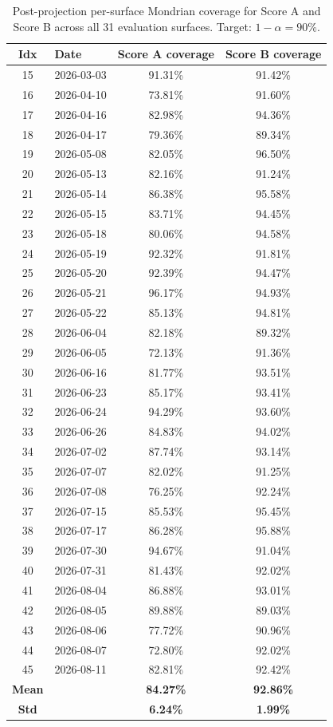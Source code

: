 \begin{table}[H]
\centering
\small
\begin{tabular}{|c|l|c|c|}
\hline
\textbf{Idx} & \textbf{Date} & \textbf{Score A coverage} & \textbf{Score B coverage} \\
\hline
15 & 2026-03-03 & 91.31\% & 91.42\% \\
16 & 2026-04-10 & 73.81\% & 91.60\% \\
17 & 2026-04-16 & 82.98\% & 94.36\% \\
18 & 2026-04-17 & 79.36\% & 89.34\% \\
19 & 2026-05-08 & 82.05\% & 96.50\% \\
20 & 2026-05-13 & 82.16\% & 91.24\% \\
21 & 2026-05-14 & 86.38\% & 95.58\% \\
22 & 2026-05-15 & 83.71\% & 94.45\% \\
23 & 2026-05-18 & 80.06\% & 94.58\% \\
24 & 2026-05-19 & 92.32\% & 91.81\% \\
25 & 2026-05-20 & 92.39\% & 94.47\% \\
26 & 2026-05-21 & 96.17\% & 94.93\% \\
27 & 2026-05-22 & 85.13\% & 94.81\% \\
28 & 2026-06-04 & 82.18\% & 89.32\% \\
29 & 2026-06-05 & 72.13\% & 91.36\% \\
30 & 2026-06-16 & 81.77\% & 93.51\% \\
31 & 2026-06-23 & 85.17\% & 93.41\% \\
32 & 2026-06-24 & 94.29\% & 93.60\% \\
33 & 2026-06-26 & 84.83\% & 94.02\% \\
34 & 2026-07-02 & 87.74\% & 93.14\% \\
35 & 2026-07-07 & 82.02\% & 91.25\% \\
36 & 2026-07-08 & 76.25\% & 92.24\% \\
37 & 2026-07-15 & 85.53\% & 95.45\% \\
38 & 2026-07-17 & 86.28\% & 95.88\% \\
39 & 2026-07-30 & 94.67\% & 91.04\% \\
40 & 2026-07-31 & 81.43\% & 92.02\% \\
41 & 2026-08-04 & 86.88\% & 93.01\% \\
42 & 2026-08-05 & 89.88\% & 89.03\% \\
43 & 2026-08-06 & 77.72\% & 90.96\% \\
44 & 2026-08-07 & 72.80\% & 92.02\% \\
45 & 2026-08-11 & 82.81\% & 92.42\% \\
\hline
\textbf{Mean} & & \textbf{84.27\%} & \textbf{92.86\%} \\
\textbf{Std}  & & \textbf{6.24\%}  & \textbf{1.99\%}  \\
\hline
\end{tabular}
\caption{Post-projection per-surface Mondrian coverage for Score A and Score B across all 31 evaluation surfaces. Target: $1-\alpha=90\%$.}
\label{tab:ablation_coverage}
\end{table}


